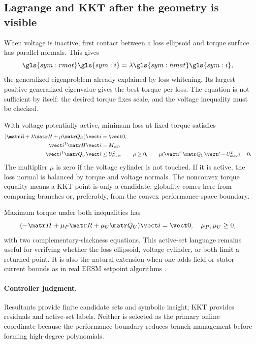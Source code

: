 \subsection{Lagrange and KKT after the geometry is visible}

When voltage is inactive, first contact between a loss ellipsoid and torque
surface has parallel normals. This gives
\begin{equation}
 \gls{sym:rmat}\gls{sym:i}=\lambda\gls{sym:hmat}\gls{sym:i},
 \label{eq:loss-torque-gep}
\end{equation}
the generalized eigenproblem already explained by loss whitening. Its largest
positive generalized eigenvalue gives the best torque per loss. The equation
is not sufficient by itself: the desired torque fixes scale, and the voltage
inequality must be checked.

With voltage potentially active, minimum loss at fixed torque satisfies
\begin{align}
 (\matr R+\lambda\matr H+\mu\matr Q_U)\vect i&=\vect0,
 \label{eq:minloss-kkt}\\
 \vect i^{\mathsf T}\matr H\vect i&=M_{\mathrm{ref}},\\
 \vect i^{\mathsf T}\matr Q_U\vect i&\leq U_{\max}^2,\qquad
 \mu\geq0,\qquad
 \mu(\vect i^{\mathsf T}\matr Q_U\vect i-U_{\max}^2)=0.
\end{align}
The multiplier \(\mu\) is zero if the voltage cylinder is not touched. If it
is active, the loss normal is balanced by torque and voltage normals. The
nonconvex torque equality means a KKT point is only a candidate; globality
comes here from comparing branches or, preferably, from the convex
performance-space boundary.

Maximum torque under both inequalities has
\begin{equation}
 (-\matr H+\mu_P\matr R+\mu_U\matr Q_U)\vect i=\vect0,
 \quad \mu_P,\mu_U\geq0,
 \label{eq:mmax-kkt}
\end{equation}
with two complementary-slackness equations. This active-set language remains
useful for verifying whether the loss ellipsoid, voltage cylinder, or both
limit a returned point. It is also the natural extension when one adds field
or stator-current bounds as in real EESM setpoint algorithms
\cite{reinhard2022}.

\paragraph{Controller judgment.}
Resultants provide finite candidate sets and symbolic insight; KKT provides
residuals and active-set labels. Neither is selected as the primary online
coordinate because the performance boundary reduces branch management before
forming high-degree polynomials.
